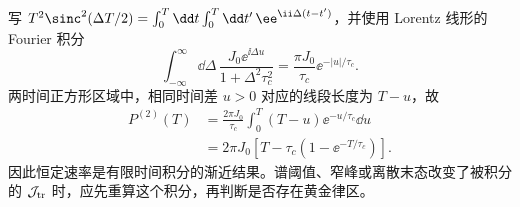 















\begin{derivation}
写 $T^2\sinc^2(\Delta T/2)=\int_0^T\dd t\int_0^T\dd t'\,\ee^{\ii\Delta(t-t')}$，并使用 Lorentz 线形的 Fourier 积分
\begin{equation*}
 \int_{-\infty}^{\infty}\dd\Delta\,
 \frac{J_0\ee^{\ii\Delta u}}{1+\Delta^2\tau_c^2}
 =\frac{\pi J_0}{\tau_c}\ee^{-|u|/\tau_c}.
\end{equation*}
两时间正方形区域中，相同时间差 $u>0$ 对应的线段长度为 $T-u$，故
\begin{align*}
 P^{(2)}(T)&=\frac{2\pi J_0}{\tau_c}
 \int_0^T(T-u)\ee^{-u/\tau_c}\dd u\\
 &=2\pi J_0[T-\tau_c(1-\ee^{-T/\tau_c})].
\end{align*}
因此恒定速率是有限时间积分的渐近结果。谱阈值、窄峰或离散末态改变了被积分的 $\mathcal J_{\rm tr}$ 时，应先重算这个积分，再判断是否存在黄金律区。
\end{derivation}
